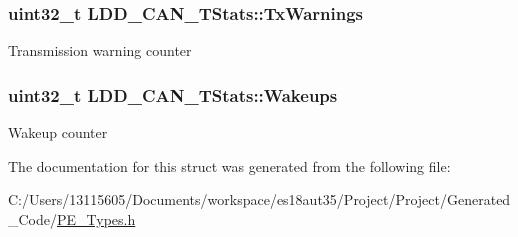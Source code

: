 \subsubsection[{Tx\+Warnings}]{\setlength{\rightskip}{0pt plus 5cm}uint32\+\_\+t L\+D\+D\+\_\+\+C\+A\+N\+\_\+\+T\+Stats\+::\+Tx\+Warnings}\label{struct_l_d_d___c_a_n___t_stats_a46ea9a5839da88b7e7b596ac34b72f90}
Transmission warning counter \hypertarget{struct_l_d_d___c_a_n___t_stats_ab59425105119b5b6496a6e0fcc8398d5}{}
\subsubsection[{Wakeups}]{\setlength{\rightskip}{0pt plus 5cm}uint32\+\_\+t L\+D\+D\+\_\+\+C\+A\+N\+\_\+\+T\+Stats\+::\+Wakeups}\label{struct_l_d_d___c_a_n___t_stats_ab59425105119b5b6496a6e0fcc8398d5}
Wakeup counter 

The documentation for this struct was generated from the following file\+:\begin{DoxyCompactItemize}
\item 
C\+:/\+Users/13115605/\+Documents/workspace/es18aut35/\+Project/\+Project/\+Generated\+\_\+\+Code/\hyperlink{_p_e___types_8h}{P\+E\+\_\+\+Types.\+h}\end{DoxyCompactItemize}
